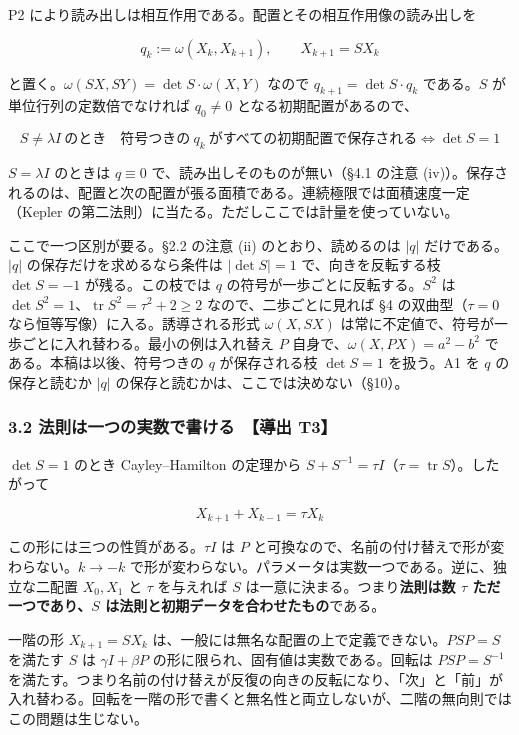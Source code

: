 \documentclass[
  a4paper,
]{ltjsarticle}
\begin{document}
P2 により読み出しは相互作用である。配置とその相互作用像の読み出しを

\[
q_k:=\omega(X_k,X_{k+1}),\qquad X_{k+1}=SX_k
\]

と置く。\(\omega(SX,SY)=\det S\cdot\omega(X,Y)\) なので
\(q_{k+1}=\det S\cdot q_k\) である。\(S\) が単位行列の定数倍でなければ
\(q_0\neq0\) となる初期配置があるので、

\[
\boxed{\;S\neq\lambda I\ \text{のとき}\quad\text{符号つきの}\ q_k\ \text{がすべての初期配置で保存される}\iff\det S=1\;}
\]

\(S=\lambda I\) のときは \(q\equiv0\) で、読み出しそのものが無い（§4.1
の注意
(iv)）。保存されるのは、配置と次の配置が張る面積である。連続極限では面積速度一定（Kepler
の第二法則）に当たる。ただしここでは計量を使っていない。

ここで一つ区別が要る。§2.2 の注意 (ii) のとおり、読めるのは
\(\lvert q\rvert\) だけである。\(\lvert q\rvert\)
の保存だけを求めるなら条件は \(\lvert\det S\rvert=1\)
で、向きを反転する枝 \(\det S=-1\) が残る。この枝では \(q\)
の符号が一歩ごとに反転する。\(S^2\) は
\(\det S^2=1\)、\(\operatorname{tr}S^2=\tau^2+2\ge2\)
なので、二歩ごとに見れば §4 の双曲型（\(\tau=0\)
なら恒等写像）に入る。誘導される形式 \(\omega(X,SX)\)
は常に不定値で、符号が一歩ごとに入れ替わる。最小の例は入れ替え \(P\)
自身で、\(\omega(X,PX)=a^2-b^2\) である。本稿は以後、符号つきの \(q\)
が保存される枝 \(\det S=1\) を扱う。A1 を \(q\) の保存と読むか
\(\lvert q\rvert\) の保存と読むかは、ここでは決めない（§10）。

\subsubsection{3.2 法則は一つの実数で書ける　【導出
T3】}\label{ux6cd5ux5247ux306fux4e00ux3064ux306eux5b9fux6570ux3067ux66f8ux3051ux308b-ux5c0eux51fa-t3}

\(\det S=1\) のとき Cayley--Hamilton の定理から
\(S+S^{-1}=\tau I\)（\(\tau=\operatorname{tr}S\)）。したがって

\[
\boxed{\;X_{k+1}+X_{k-1}=\tau X_k\;}
\]

この形には三つの性質がある。\(\tau I\) は \(P\)
と可換なので、名前の付け替えで形が変わらない。\(k\to-k\)
で形が変わらない。パラメータは実数一つである。逆に、独立な二配置
\(X_0,X_1\) と \(\tau\) を与えれば \(S\)
は一意に決まる。つまり\textbf{法則は数 \(\tau\) ただ一つであり、\(S\)
は法則と初期データを合わせたもの}である。

一階の形 \(X_{k+1}=SX_k\)
は、一般には無名な配置の上で定義できない。\(PSP=S\) を満たす \(S\) は
\(\gamma I+\beta P\) の形に限られ、固有値は実数である。回転は
\(PSP=S^{-1}\)
を満たす。つまり名前の付け替えが反復の向きの反転になり、「次」と「前」が入れ替わる。回転を一階の形で書くと無名性と両立しないが、二階の無向則ではこの問題は生じない。
\end{document}
